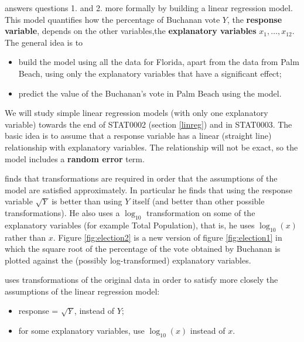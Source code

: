 \documentclass[
  british,
]{book}
\providecommand{\tightlist}{%
  \setlength{\itemsep}{0pt}\setlength{\parskip}{0pt}}
\begin{document}
\citet{election} answers questions 1. and 2. more formally by building a linear regression model. This model quantifies how the percentage of Buchanan vote \(Y\), the \textbf{response variable}, depends on the other variables,the \textbf{explanatory variables} \(x_1,\ldots,x_{12}\). The general idea is to

\begin{itemize}
\tightlist
\item
  build the model using all the data for Florida, apart from the data from Palm Beach, using only the explanatory variables that have a significant effect;
\item
  predict the value of the Buchanan's vote in Palm Beach using the model.
\end{itemize}

We will study simple linear regression models (with only one explanatory variable) towards the end of STAT0002 (section \ref{linreg}) and in STAT0003. The basic idea is to assume that a response variable has a linear (straight line) relationship with explanatory variables. The relationship will not be exact, so the model includes a \textbf{random error} term.

\citet{election} finds that transformations are required in order that the assumptions of the model are satisfied approximately. In particular he finds that using the response variable \(\sqrt{Y}\) is better than using \(Y\) itself (and better than other possible transformations). He also uses a \(\log_{10}\) transformation on some of the explanatory variables (for example Total Population), that is, he uses \(\log_{10}(x)\) rather than \(x\). Figure \ref{fig:election2} is a new version of figure \ref{fig:election1} in which the square root of the percentage of the vote obtained by Buchanan is plotted against the (possibly log-transformed) explanatory variables.

\citet{election} uses transformations of the original data in order to satisfy more closely the assumptions of the linear regression model:

\begin{itemize}
\tightlist
\item
  response = \(\sqrt{Y}\), instead of \(Y\);
\item
  for some explanatory variables, use \(\log_{10}(x)\) instead of \(x\).
\end{itemize}
\end{document}

